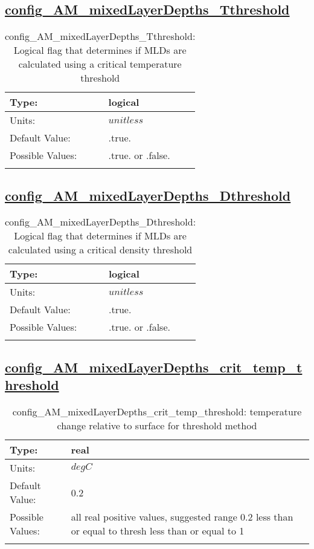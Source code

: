 \subsection[config\_AM\_mixedLayerDepths\_Tthreshold]{\hyperref[sec:nm_tab_AM_mixedLayerDepths]{config\_AM\_mixedLayerDepths\_Tthreshold}}
\label{subsec:nm_sec_config_AM_mixedLayerDepths_Tthreshold}
\begin{center}
\begin{longtable}{| p{2.0in} || p{4.0in} |}
    \hline
    Type: & logical \\
    \hline
    Units: & $unitless$ \\
    \hline
    Default Value: & .true. \\
    \hline
    Possible Values: & .true. or .false. \\
    \hline
    \caption{config\_AM\_mixedLayerDepths\_Tthreshold: Logical flag that determines if MLDs are calculated using a critical temperature threshold}
\end{longtable}
\end{center}
\subsection[config\_AM\_mixedLayerDepths\_Dthreshold]{\hyperref[sec:nm_tab_AM_mixedLayerDepths]{config\_AM\_mixedLayerDepths\_Dthreshold}}
\label{subsec:nm_sec_config_AM_mixedLayerDepths_Dthreshold}
\begin{center}
\begin{longtable}{| p{2.0in} || p{4.0in} |}
    \hline
    Type: & logical \\
    \hline
    Units: & $unitless$ \\
    \hline
    Default Value: & .true. \\
    \hline
    Possible Values: & .true. or .false. \\
    \hline
    \caption{config\_AM\_mixedLayerDepths\_Dthreshold: Logical flag that determines if MLDs are calculated using a critical density threshold}
\end{longtable}
\end{center}
\subsection[config\_AM\_mixedLayerDepths\_crit\_temp\_threshold]{\hyperref[sec:nm_tab_AM_mixedLayerDepths]{config\_AM\_mixedLayerDepths\_crit\_temp\_threshold}}
\label{subsec:nm_sec_config_AM_mixedLayerDepths_crit_temp_threshold}
\begin{center}
\begin{longtable}{| p{2.0in} || p{4.0in} |}
    \hline
    Type: & real \\
    \hline
    Units: & $degC$ \\
    \hline
    Default Value: & 0.2 \\
    \hline
    Possible Values: & all real positive values, suggested range 0.2 less than or equal to thresh less than or equal to 1 \\
    \hline
    \caption{config\_AM\_mixedLayerDepths\_crit\_temp\_threshold: temperature change relative to surface for threshold method}
\end{longtable}
\end{center}
